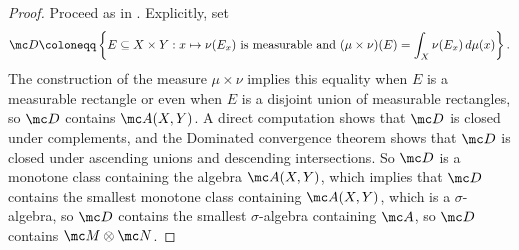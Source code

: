 \documentclass[../notes.tex]{subfiles}
\begin{document}
\begin{proof}
	Proceed as in . Explicitly, set
	\[\mc D\coloneqq\left\{E\subseteq X\times Y:x\mapsto\nu(E_x)\text{ is measurable and }(\mu\times\nu)(E)=\int_X\nu(E_x)\,d\mu(x)\right\}.\]
	The construction of the measure $\mu\times\nu$ implies this equality when $E$ is a measurable rectangle or even when $E$ is a disjoint union of measurable rectangles, so $\mc D$ contains $\mc A(X,Y)$. A direct computation shows that $\mc D$ is closed under complements, and the Dominated convergence theorem \cite[Theorem~9.14]{elber-top} shows that $\mc D$ is closed under ascending unions and descending intersections. So $\mc D$ is a monotone class containing the algebra $\mc A(X,Y)$, which implies that $\mc D$ contains the smallest monotone class containing $\mc A(X,Y)$, which is a $\sigma$-algebra, so $\mc D$ contains the smallest $\sigma$-algebra containing $\mc A$, so $\mc D$ contains $\mc M\otimes\mc N$.
\end{proof}
\end{document}
